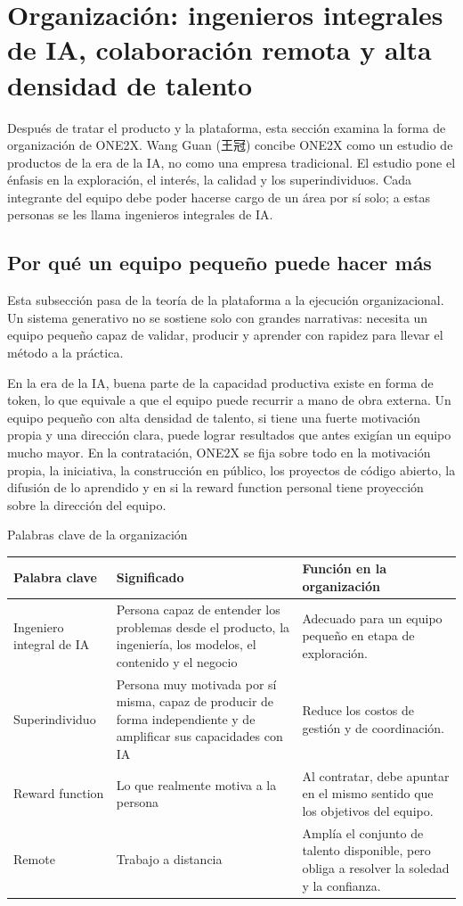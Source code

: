 \section{Organización: ingenieros integrales de IA, colaboración remota y alta densidad de talento}

Después de tratar el producto y la plataforma, esta sección examina la forma de organización de ONE2X. Wang Guan (王冠) concibe ONE2X como un estudio de productos de la era de la IA, no como una empresa tradicional. El estudio pone el énfasis en la exploración, el interés, la calidad y los superindividuos. Cada integrante del equipo debe poder hacerse cargo de un área por sí solo; a estas personas se les llama ingenieros integrales de IA.

\subsection{Por qué un equipo pequeño puede hacer más}

Esta subsección pasa de la teoría de la plataforma a la ejecución organizacional. Un sistema generativo no se sostiene solo con grandes narrativas: necesita un equipo pequeño capaz de validar, producir y aprender con rapidez para llevar el método a la práctica.

En la era de la IA, buena parte de la capacidad productiva existe en forma de token, lo que equivale a que el equipo puede recurrir a mano de obra externa. Un equipo pequeño con alta densidad de talento, si tiene una fuerte motivación propia y una dirección clara, puede lograr resultados que antes exigían un equipo mucho mayor. En la contratación, ONE2X se fija sobre todo en la motivación propia, la iniciativa, la construcción en público, los proyectos de código abierto, la difusión de lo aprendido y en si la reward function personal tiene proyección sobre la dirección del equipo.

\begin{knowledgebox}{Palabras clave de la organización}
\begin{tabularx}{\textwidth}{p{}p{}X}
\toprule
Palabra clave & Significado & Función en la organización \\
\midrule
Ingeniero integral de IA & Persona capaz de entender los problemas desde el producto, la ingeniería, los modelos, el contenido y el negocio & Adecuado para un equipo pequeño en etapa de exploración. \\
Superindividuo & Persona muy motivada por sí misma, capaz de producir de forma independiente y de amplificar sus capacidades con IA & Reduce los costos de gestión y de coordinación. \\
Reward function & Lo que realmente motiva a la persona & Al contratar, debe apuntar en el mismo sentido que los objetivos del equipo. \\
Remote & Trabajo a distancia & Amplía el conjunto de talento disponible, pero obliga a resolver la soledad y la confianza. \\
\bottomrule
\end{tabularx}
\end{knowledgebox}

